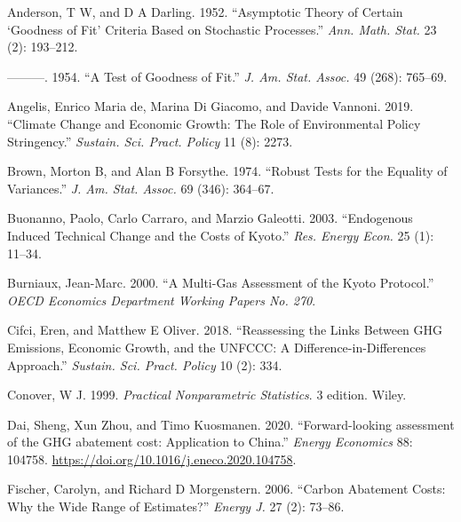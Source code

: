\documentclass[
  letterpaper,
  DIV=11,
  numbers=noendperiod]{scrartcl}
\newlength{\cslhangindent}
\newlength{\cslentryspacingunit} %
\newenvironment{CSLReferences}[2] %
 {%
  \setlength{\parindent}{0pt}
  \ifodd #1
  \let\oldpar\par
  \def\par{\hangindent=\cslhangindent\oldpar}
  \fi
  \setlength{\parskip}{#2\cslentryspacingunit}
 }%
 {}
\begin{document}
\hypertarget{refs}{}
\begin{CSLReferences}{1}{0}
\leavevmode{}%
Anderson, T W, and D A Darling. 1952. {``Asymptotic Theory of Certain
{`Goodness of Fit'} Criteria Based on Stochastic Processes.''}
\emph{Ann. Math. Stat.} 23 (2): 193--212.

\leavevmode{}%
---------. 1954. {``A Test of Goodness of Fit.''} \emph{J. Am. Stat.
Assoc.} 49 (268): 765--69.

\leavevmode{}%
Angelis, Enrico Maria de, Marina Di Giacomo, and Davide Vannoni. 2019.
{``Climate Change and Economic Growth: The Role of Environmental Policy
Stringency.''} \emph{Sustain. Sci. Pract. Policy} 11 (8): 2273.

\leavevmode{}%
Brown, Morton B, and Alan B Forsythe. 1974. {``Robust Tests for the
Equality of Variances.''} \emph{J. Am. Stat. Assoc.} 69 (346): 364--67.

\leavevmode{}%
Buonanno, Paolo, Carlo Carraro, and Marzio Galeotti. 2003. {``Endogenous
Induced Technical Change and the Costs of Kyoto.''} \emph{Res. Energy
Econ.} 25 (1): 11--34.

\leavevmode{}%
Burniaux, Jean-Marc. 2000. {``A Multi-Gas Assessment of the Kyoto
Protocol.''} \emph{OECD Economics Department Working Papers No. 270}.

\leavevmode{}%
Cifci, Eren, and Matthew E Oliver. 2018. {``Reassessing the Links
Between {GHG} Emissions, Economic Growth, and the {UNFCCC}: A
{Difference-in-Differences} Approach.''} \emph{Sustain. Sci. Pract.
Policy} 10 (2): 334.

\leavevmode{}%
Conover, W J. 1999. \emph{Practical Nonparametric Statistics}. 3
edition. Wiley.

\leavevmode{}%
Dai, Sheng, Xun Zhou, and Timo Kuosmanen. 2020. {``{Forward-looking
assessment of the GHG abatement cost: Application to China}.''}
\emph{Energy Economics} 88: 104758.
\url{https://doi.org/10.1016/j.eneco.2020.104758}.

\leavevmode{}%
Fischer, Carolyn, and Richard D Morgenstern. 2006. {``Carbon Abatement
Costs: Why the Wide Range of Estimates?''} \emph{Energy J.} 27 (2):
73--86.


\end{CSLReferences}
\end{document}
